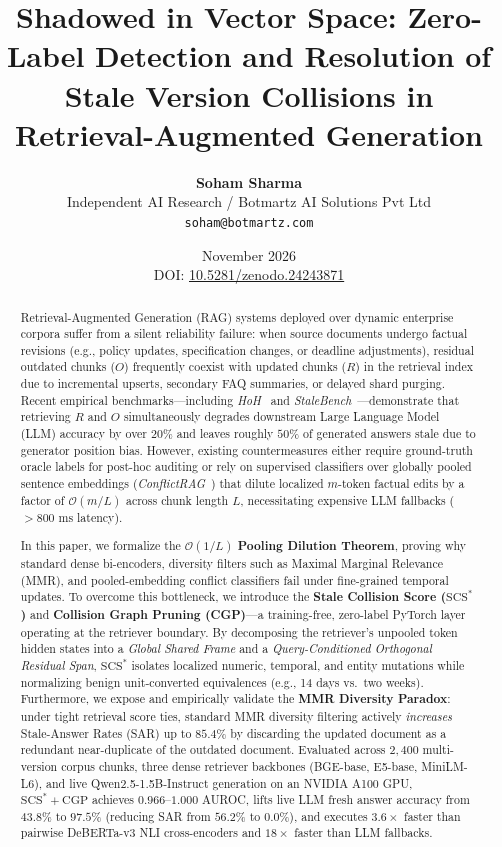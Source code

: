 \documentclass[11pt,a4paper]{article}
\title{\textbf{Shadowed in Vector Space: Zero-Label Detection and Resolution of Stale Version Collisions in Retrieval-Augmented Generation}}
\author{
  \textbf{Soham Sharma}\\
  Independent AI Research / Botmartz AI Solutions Pvt Ltd\\
  \texttt{soham@botmartz.com}
}
\date{November 2026 \\ \small DOI: \href{https://doi.org/10.5281/zenodo.24243871}{10.5281/zenodo.24243871}}
\theoremstyle{definition}
\newcommand{\SCS}{\mathrm{SCS}^*}
\begin{document}
\maketitle

\begin{abstract}
Retrieval-Augmented Generation (RAG) systems deployed over dynamic enterprise corpora suffer from a silent reliability failure: when source documents undergo factual revisions (e.g., policy updates, specification changes, or deadline adjustments), residual outdated chunks ($O$) frequently coexist with updated chunks ($R$) in the retrieval index due to incremental upserts, secondary FAQ summaries, or delayed shard purging. Recent empirical benchmarks---including \emph{HoH}~\cite{ouyang2025hoh} and \emph{StaleBench}~\cite{singh2026stalebench}---demonstrate that retrieving $R$ and $O$ simultaneously degrades downstream Large Language Model (LLM) accuracy by over $20\%$ and leaves roughly $50\%$ of generated answers stale due to generator position bias. However, existing countermeasures either require ground-truth oracle labels for post-hoc auditing or rely on supervised classifiers over globally pooled sentence embeddings (\emph{ConflictRAG}~\cite{wang2026conflictrag}) that dilute localized $m$-token factual edits by a factor of $\mathcal{O}(m/L)$ across chunk length $L$, necessitating expensive LLM fallbacks ($>800\text{ ms}$ latency).

In this paper, we formalize the $\mathcal{O}(1/L)$ \textbf{Pooling Dilution Theorem}, proving why standard dense bi-encoders, diversity filters such as Maximal Marginal Relevance (MMR), and pooled-embedding conflict classifiers fail under fine-grained temporal updates. To overcome this bottleneck, we introduce the \textbf{Stale Collision Score ($\SCS$)} and \textbf{Collision Graph Pruning (CGP)}---a training-free, zero-label PyTorch layer operating at the retriever boundary. By decomposing the retriever's unpooled token hidden states into a \emph{Global Shared Frame} and a \emph{Query-Conditioned Orthogonal Residual Span}, $\SCS$ isolates localized numeric, temporal, and entity mutations while normalizing benign unit-converted equivalences (e.g., 14 days vs.\ two weeks). Furthermore, we expose and empirically validate the \textbf{MMR Diversity Paradox}: under tight retrieval score ties, standard MMR diversity filtering actively \emph{increases} Stale-Answer Rates (SAR) up to $85.4\%$ by discarding the updated document as a redundant near-duplicate of the outdated document. Evaluated across $2{,}400$ multi-version corpus chunks, three dense retriever backbones (BGE-base, E5-base, MiniLM-L6), and live Qwen2.5-1.5B-Instruct generation on an NVIDIA A100 GPU, $\SCS+\mathrm{CGP}$ achieves $0.966$--$1.000$ AUROC, lifts live LLM fresh answer accuracy from $43.8\%$ to $97.5\%$ (reducing SAR from $56.2\%$ to $0.0\%$), and executes $3.6\times$ faster than pairwise DeBERTa-v3 NLI cross-encoders and $18\times$ faster than LLM fallbacks.
\end{abstract}
\end{document}

